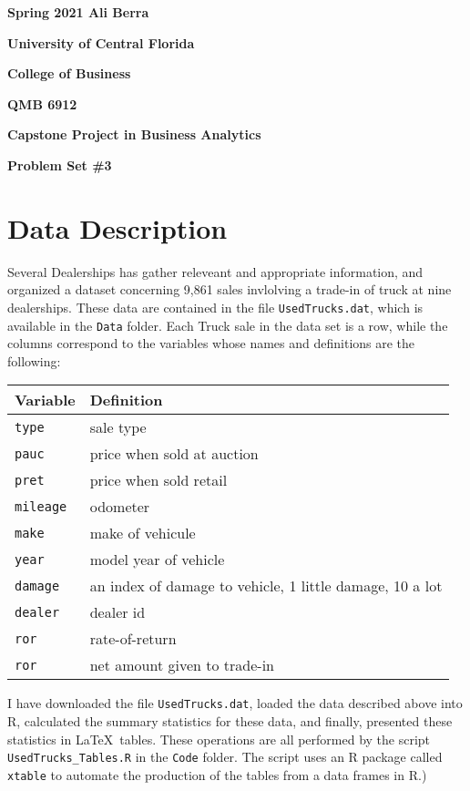 \documentclass[11pt]{article}
\begin{document}

{\noindent\bf Spring 2021 \hfill Ali Berra}
\vskip 16pt
\centerline{\bf University of Central Florida}
\centerline{\bf College of Business }
\vskip 16pt
\centerline{\bf QMB 6912}
\centerline{\bf Capstone Project in Business Analytics}
\vskip 10pt
\centerline{\bf Problem Set \#3}
\vskip 32pt
\noindent
%
\section{Data Description}
%
Several Dealerships has gather releveant and appropriate information, and organized a dataset concerning 9,861 sales invlolving a trade-in of truck at nine dealerships.  These data are contained in the file {\tt UsedTrucks.dat}, which is
available in the {\tt Data} folder.
Each Truck sale in the data set is a row, while the columns correspond
to the variables whose names and definitions are the following:
\bigskip
\begin{table}[ht]
\centering
\begin{tabular}{ll}
  \hline
    Variable & Definition \\
  \hline

    {\tt type}        &sale type \\
    {\tt pauc}       &price when sold at auction \\
    {\tt pret}      &price when sold retail \\
    {\tt mileage}    &odometer \\
    {\tt make}       &make of vehicule \\
    {\tt year}       &model year of vehicle \\
    {\tt damage}      &an index of damage to vehicle, 1 little damage, 10 a lot\\
    {\tt dealer}     &dealer id \\
    {\tt ror}    &rate-of-return \\
    {\tt ror}             &net amount given to trade-in \\
  \hline
\end{tabular}
\end{table}

\bigskip
\noindent
I have downloaded the file {\tt UsedTrucks.dat},
loaded the data described above into
\textsf{R},
calculated the summary statistics for these data,
and finally, presented
these statistics in \LaTeX\ tables.
These operations are all performed by the script
{\tt UsedTrucks\_Tables.R} in the {\tt Code} folder.
The script uses an \textsf{R} package called {\tt xtable}
to automate the
production of the tables from a data frames in \textsf{R}.)
\end{document}
